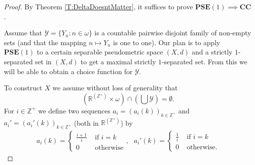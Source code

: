 \documentclass[11pt, reqno]{amsart}
\theoremstyle{definition}
\numberwithin{theorem}{section}
\theoremstyle{definition}
\theoremstyle{definition}
\theoremstyle{definition}
\theoremstyle{definition}
\theoremstyle{definition}
\numberwithin{claim}{section}
\theoremstyle{definition}
\theoremstyle{definition}
\theoremstyle{definition}
\theoremstyle{definition}
\theoremstyle{definition}
\theoremstyle{remboldstyle}
\begin{document}
\begin{proof}
By Theorem \ref{T:DeltaDoesntMatter}, it suffices to prove $\mathbf{PSE}(1) \implies \mathbf{CC}$.
\par
Assume that $\mathcal{Y} = \{Y_n : n \in \omega \}$ is a countable pairwise disjoint family of non-empty sets (and that the mapping $n \mapsto Y_n$ is one to one).  Our plan is to apply $\mathbf{PSE}(1)$ to a certain separable pseudometric space $(X,d)$ and a strictly $1$-separated set in $(X,d)$ to get a maximal strictly $1$-separated set.  From this we will be able to obtain a choice function for $\mathcal{Y}$.
\par
To construct $X$ we assume without loss of generality that 
\begin{equation}
\label{E:DjntnssCondition}
\left(\mathbb{R}^{(\mathbb{Z}^+)} \times \omega\right) \cap \left(\bigcup \mathcal{Y}\right) = \emptyset.
\end{equation}
For $i \in \mathbb{Z}^+$ we define two sequences $a_i = (a_i(k))_{k\in \mathbb{Z}^+}$ and $a_i' = ( a_i'(k))_{k \in \mathbb{Z}^+}$ (both in $\mathbb{R}^{(\mathbb{Z}^+)}$) by 
\begin{align*}
a_i(k) = \begin{cases}\frac{i+1}{i} & \mbox{ if } i = k\\
                       0 & \mbox{ otherwise}
         \end{cases} , \,\,\,\,
a_i'(k) = \begin{cases} \frac{1}{i} & \mbox{ if }i = k \\
                        0 & \mbox{ otherwise} .
          \end{cases}              
\end{align*}


\end{proof}
\end{document}
